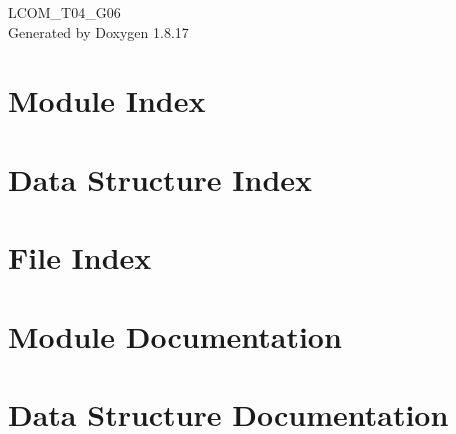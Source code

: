 \let\mypdfximage\pdfximage\def\pdfximage{\immediate\mypdfximage}\documentclass[twoside]{book}
\newcommand{\+}{\discretionary{\mbox{\scriptsize$\hookleftarrow$}}{}{}}
\newcommand{\clearemptydoublepage}{%
  \newpage{\pagestyle{empty}\cleardoublepage}%
}
\begin{document}
\hypersetup{pageanchor=false,
             bookmarksnumbered=true,
             pdfencoding=unicode
            }
\begin{titlepage}
\vspace*{7cm}
\begin{center}%
{\Large L\+C\+O\+M\+\_\+\+T04\+\_\+\+G06 }\\
\vspace*{1cm}
{\large Generated by Doxygen 1.8.17}\\
\end{center}
\end{titlepage}
\clearemptydoublepage
{}
\tableofcontents
\clearemptydoublepage
{}
\hypersetup{pageanchor=true}

\chapter{Module Index}

\chapter{Data Structure Index}

\chapter{File Index}

\chapter{Module Documentation}










\chapter{Data Structure Documentation}





\end{document}

